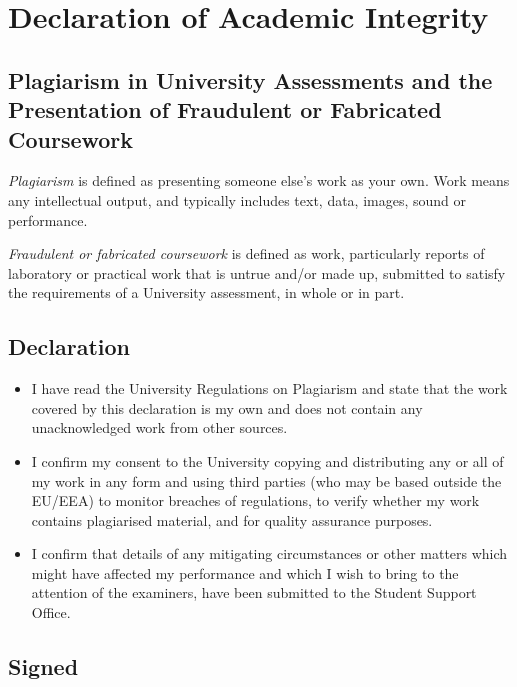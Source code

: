 \chapter*{Declaration of Academic Integrity}
\section*{Plagiarism in University Assessments and the Presentation of Fraudulent or Fabricated Coursework}
\emph{Plagiarism} is defined as presenting someone else’s work as your own. Work means any intellectual output, and typically includes text, data, images, sound or performance.

\emph{Fraudulent or fabricated coursework} is defined as work, particularly reports of laboratory or practical work that is untrue and/or made up, submitted to satisfy the requirements of a University assessment, in whole or in part.

\section*{Declaration}
\begin{itemize}
    \item I have read the University Regulations on Plagiarism and state that the work covered by this declaration is my own and does not contain any unacknowledged work from other sources.
    \item I confirm my consent to the University copying and distributing any or all of my work in any form and using third parties (who may be based outside the EU/EEA) to monitor breaches of regulations, to verify whether my work contains plagiarised material, and for quality assurance purposes.
    \item I confirm that details of any mitigating circumstances or other matters which might have affected my performance and which I wish to bring to the attention of the examiners, have been submitted to the Student Support Office.
\end{itemize}

\vfill

\section*{Signed}
